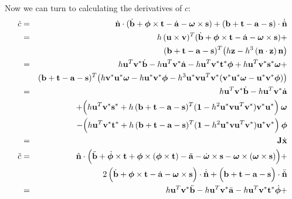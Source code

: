 Now we can turn to calculating the derivatives of $c$:
\begin{eqnarray}
\dot{c} &=& \hat{\ve{n}}\cdot(\dot{\ve{b}} + \ve{\phi}\times\ve{t} - \dot{\ve{a}} -
        \ve{\omega}\times\ve{s}) + (\ve{b}+\ve{t}-\ve{a}-\ve{s})\cdot\dot{\hat{\ve{n}}} \\*
    &=& h\,(\ve{u}\times\ve{v})^T (\dot{\ve{b}} + \ve{\phi}\times\ve{t} - \dot{\ve{a}} -
        \ve{\omega}\times\ve{s}) + \nonumber\\*&&
        (\ve{b}+\ve{t}-\ve{a}-\ve{s})^T \big( h\ve{z} - h^3\,(\ve{n}\cdot\ve{z})\,\ve{n} \big)
        \nonumber\\
    &=& h\ve{u}^T\dual{\ve{v}}\dot{\ve{b}} - h\ve{u}^T\dual{\ve{v}}\dot{\ve{a}} -
        h\ve{u}^T\dual{\ve{v}}\dual{\ve{t}}\ve{\phi} +
        h\ve{u}^T\dual{\ve{v}}\dual{\ve{s}}\ve{\omega} + \nonumber\\*&&
        (\ve{b}+\ve{t}-\ve{a}-\ve{s})^T
        \big(h\dual{\ve{v}}\dual{\ve{u}}\ve{\omega} - h\dual{\ve{u}}\dual{\ve{v}}\ve{\phi} -
        h^3\dual{\ve{u}}\ve{v}\ve{u}^T\dual{\ve{v}}
        (\dual{\ve{v}}\dual{\ve{u}}\ve{\omega} - \dual{\ve{u}}\dual{\ve{v}}\ve{\phi})\big)
        \nonumber\\
    &=& h\ve{u}^T\dual{\ve{v}}\dot{\ve{b}} - h\ve{u}^T\dual{\ve{v}}\dot{\ve{a}} \nonumber\\*&&
        +\Big( h\ve{u}^T\dual{\ve{v}}\dual{\ve{s}} + h\,(\ve{b}+\ve{t}-\ve{a}-\ve{s})^T
        (\m{1} - h^2 \dual{\ve{u}}\ve{v}\ve{u}^T\dual{\ve{v}}) \dual{\ve{v}}\dual{\ve{u}}
        \Big)\:\ve{\omega} \nonumber\\*&&
        -\Big( h\ve{u}^T\dual{\ve{v}}\dual{\ve{t}} + h\,(\ve{b}+\ve{t}-\ve{a}-\ve{s})^T
        (\m{1} - h^2 \dual{\ve{u}}\ve{v}\ve{u}^T\dual{\ve{v}}) \dual{\ve{u}}\dual{\ve{v}}
        \Big)\:\ve{\phi} \\*
    &=& \m{J}\dot{\ve{x}} \nonumber\\
\ddot{c} &=& \hat{\ve{n}}\cdot\Big(\ddot{\ve{b}} + \dot{\ve{\phi}}\times\ve{t} +
        \ve{\phi}\times(\ve{\phi}\times\ve{t}) - \ddot{\ve{a}} - \dot{\ve{\omega}}\times\ve{s} -
        \ve{\omega}\times(\ve{\omega}\times\ve{s})\Big) + \nonumber\\*&&
        2\,\Big(\dot{\ve{b}} + \ve{\phi}\times\ve{t} - \dot{\ve{a}} - \ve{\omega}\times\ve{s}\Big)
        \cdot\dot{\hat{\ve{n}}} +
        \Big(\ve{b} + \ve{t} - \ve{a} - \ve{s}\Big)\cdot\ddot{\hat{\ve{n}}} \\
    &=& h\ve{u}^T\dual{\ve{v}}\ddot{\ve{b}} - h\ve{u}^T\dual{\ve{v}}\ddot{\ve{a}} -
        h\ve{u}^T\dual{\ve{v}}\dual{\ve{t}}\dot{\ve{\phi}} +

\end{eqnarray}
